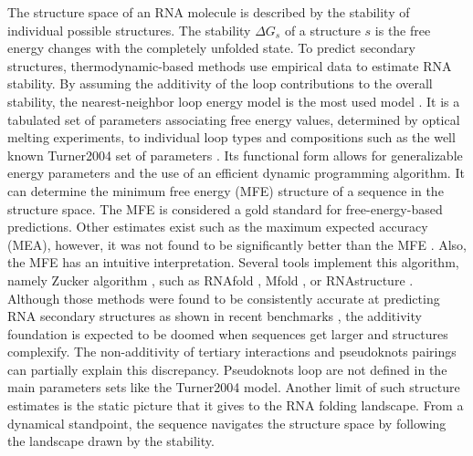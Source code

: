 \documentclass[a4paper,12pt]{article}
\begin{document}
The structure space of an RNA molecule is described by the stability of
individual possible structures. The stability \(\Delta G_s\) of a structure \(s\) is
the free energy changes with the completely unfolded state. To predict secondary
structures, thermodynamic-based methods use empirical data to estimate RNA
stability. By assuming the additivity \cite{dill97_addit_princ_bioch} of the loop
contributions to the overall stability, the nearest-neighbor loop energy model
is the most used model \cite{turner09_nndb}. It is a tabulated set of parameters
associating free energy values, determined by optical melting experiments, to
individual loop types and compositions such as the well known Turner2004 set of
parameters \cite{mathews04_incor_chemic_modif_const_into}. Its functional form
allows for generalizable energy parameters and the use of an efficient dynamic
programming algorithm. It can determine the minimum free energy (MFE) structure
of a sequence in the structure space. The MFE is considered a gold standard for
free-energy-based predictions. Other estimates exist such as the maximum
expected accuracy (MEA), however, it was not found to be significantly better
than the MFE \cite{mathews19_how_to_bench_rna_secon}. Also, the MFE has an
intuitive interpretation. Several tools implement this algorithm, namely Zucker
algorithm \cite{zuker81_optim_comput_foldin_large_rna}, such as RNAfold
\cite{hofacker03_vienn_rna_secon_struc_server}, Mfold
\cite{zuker03_mfold_web_server_nucleic_acid}, or RNAstructure \cite{reuter10_rnast}.
Although those methods were found to be consistently accurate at predicting RNA
secondary structures as shown in recent benchmarks
\cite{sato20_rna,huang19_linear}, the additivity foundation is expected to be
doomed when sequences get larger and structures complexify. The non-additivity
of tertiary interactions and pseudoknots pairings can partially explain this
discrepancy. Pseudoknots loop are not defined in the main parameters sets like
the Turner2004 model. Another limit of such structure estimates is the static
picture that it gives to the RNA folding landscape. From a dynamical standpoint,
the sequence navigates the structure space by following the landscape drawn by
the stability.
\end{document}
